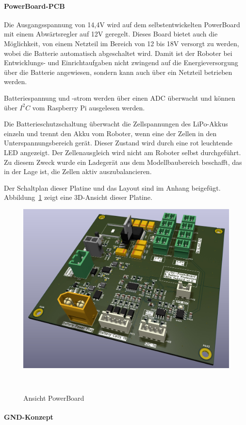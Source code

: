\documentclass[main.tex]{subfiles} %
\begin{document}
\paragraph{PowerBoard-PCB}
Die Ausgangsspannung von 14,4V wird auf dem selbstentwickelten PowerBoard mit
einem Abwärtsregler auf 12V geregelt. Dieses Board bietet auch die Möglichkeit,
von einem Netzteil im Bereich von 12 bis 18V versorgt zu werden, wobei die
Batterie automatisch abgeschaltet wird. Damit ist der Roboter bei Entwicklungs-
und Einrichtaufgaben nicht zwingend auf die Energieversorgung über die Batterie
angewiesen, sondern kann auch über ein Netzteil betrieben werden.

Batteriespannung und -strom werden über einen ADC überwacht und können über
$I^2C$ vom Raspberry Pi ausgelesen werden.

Die Batterieschutzschaltung überwacht die Zellspannungen des LiPo-Akkus einzeln
und trennt den Akku vom Roboter, wenn eine der Zellen in den
Unterspannungsbereich gerät. Dieser Zustand wird durch eine rot leuchtende LED
angezeigt. Der Zellenausgleich wird nicht am Roboter selbst durchgeführt. Zu
diesem Zweck wurde ein Ladegerät aus dem Modellbaubereich beschafft, das in der
Lage ist, die Zellen aktiv auszubalancieren.

Der Schaltplan dieser Platine und das Layout sind im Anhang beigefügt.
Abbildung~\ref{PowerBoard_Ansicht} zeigt eine 3D-Ansicht dieser Platine.

\begin{figure}[H]
    \centering
    \includegraphics[width = 0.75\linewidth]{fig_Bordnetz/PowerDistributionBoard.jpg}
    \caption{Ansicht PowerBoard}~\label{PowerBoard_Ansicht}
\end{figure}

\paragraph{GND-Konzept}
\end{document}
